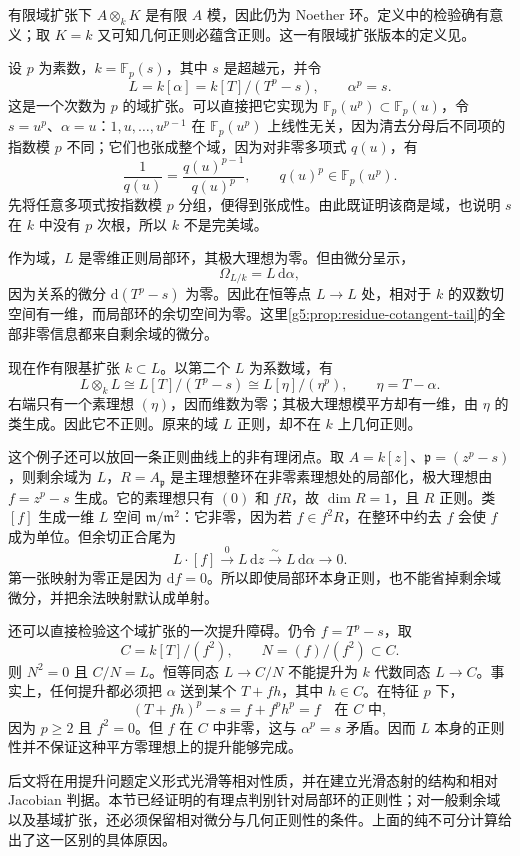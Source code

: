 有限域扩张下 \(A\otimes_kK\) 是有限 \(A\) 模，因此仍为 Noether 环。定义中的检验确有意义；取 \(K=k\) 又可知几何正则必蕴含正则。这一有限域扩张版本的定义见\cite[第28节，第219页]{Matsumura1989}。

\begin{example}\label{g5:exm:inseparable-regular-point}
	设 \(p\) 为素数，\(k=\mathbb F_p(s)\)，其中 \(s\) 是超越元，并令
	\[
		L=k[\alpha]=k[T]/(T^p-s),\qquad\alpha^p=s.
	\]
	这是一个次数为 \(p\) 的域扩张。可以直接把它实现为 \(\mathbb F_p(u^p)\subset\mathbb F_p(u)\)，令 \(s=u^p\)、\(\alpha=u\)：\(1,u,\ldots,u^{p-1}\) 在 \(\mathbb F_p(u^p)\) 上线性无关，因为清去分母后不同项的指数模 \(p\) 不同；它们也张成整个域，因为对非零多项式 \(q(u)\)，有
	\[
		\frac1{q(u)}=\frac{q(u)^{p-1}}{q(u)^p},
		\qquad q(u)^p\in\mathbb F_p(u^p).
	\]
	先将任意多项式按指数模 \(p\) 分组，便得到张成性。由此既证明该商是域，也说明 \(s\) 在 \(k\) 中没有 \(p\) 次根，所以 \(k\) 不是完美域。

	作为域，\(L\) 是零维正则局部环，其极大理想为零。但由微分呈示，
	\[
		\Omega_{L/k}=L\,\mathrm{d}\alpha,
	\]
	因为关系的微分 \(\mathrm{d}(T^p-s)\) 为零。因此在恒等点 \(L\to L\) 处，相对于 \(k\) 的双数切空间有一维，而局部环的余切空间为零。这里\cref{g5:prop:residue-cotangent-tail}的全部非零信息都来自剩余域的微分。

	现在作有限基扩张 \(k\subset L\)。以第二个 \(L\) 为系数域，有
	\[
		L\otimes_kL
		\cong L[T]/(T^p-s)
		\cong L[\eta]/(\eta^p),\qquad\eta=T-\alpha.
	\]
	右端只有一个素理想 \((\eta)\)，因而维数为零；其极大理想模平方却有一维，由 \(\eta\) 的类生成。因此它不正则。原来的域 \(L\) 正则，却不在 \(k\) 上几何正则。
\end{example}

这个例子还可以放回一条正则曲线上的非有理闭点。取 \(A=k[z]\)、\(\mathfrak p=(z^p-s)\)，则剩余域为 \(L\)，\(R=A_{\mathfrak p}\) 是主理想整环在非零素理想处的局部化，极大理想由 \(f=z^p-s\) 生成。它的素理想只有 \((0)\) 和 \(fR\)，故 \(\dim R=1\)，且 \(R\) 正则。类 \([f]\) 生成一维 \(L\) 空间 \(\mathfrak m/\mathfrak m^2\)：它非零，因为若 \(f\in f^2R\)，在整环中约去 \(f\) 会使 \(f\) 成为单位。但余切正合尾为
\[
	L\cdot[f]\xrightarrow{\ 0\ }L\,\mathrm{d}z
	\xrightarrow{\ \sim\ }L\,\mathrm{d}\alpha\longrightarrow0.
\]
第一张映射为零正是因为 \(\mathrm{d}f=0\)。所以即使局部环本身正则，也不能省掉剩余域微分，并把余法映射默认成单射。

\ProseParagraphBreak

还可以直接检验这个域扩张的一次提升障碍。仍令 \(f=T^p-s\)，取
\[
	C=k[T]/(f^2),\qquad N=(f)/(f^2)\subset C.
\]
则 \(N^2=0\) 且 \(C/N=L\)。恒等同态 \(L\to C/N\) 不能提升为 \(k\) 代数同态 \(L\to C\)。事实上，任何提升都必须把 \(\alpha\) 送到某个 \(T+fh\)，其中 \(h\in C\)。在特征 \(p\) 下，
\[
	(T+fh)^p-s=f+f^ph^p=f\quad\text{在 }C\text{ 中},
\]
因为 \(p\geq2\) 且 \(f^2=0\)。但 \(f\) 在 \(C\) 中非零，这与 \(\alpha^p=s\) 矛盾。因而 \(L\) 本身的正则性并不保证这种平方零理想上的提升能够完成。

\ProseParagraphBreak

后文将在用提升问题定义形式光滑等相对性质，并在建立光滑态射的结构和相对 Jacobian 判据。本节已经证明的有理点判别针对局部环的正则性；对一般剩余域以及基域扩张，还必须保留相对微分与几何正则性的条件。上面的纯不可分计算给出了这一区别的具体原因。
